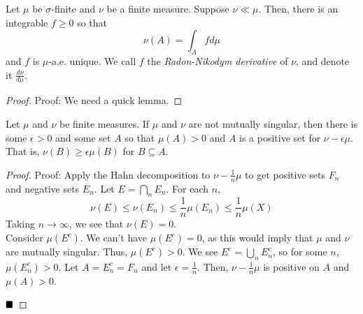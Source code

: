 \begin{theorem}
    Let $\mu$ be $\sigma$-finite and $\nu$ be a finite measure. Suppose $\nu \ll \mu$. Then, there is an integrable $f \geq 0$ so that
    \[ \nu(A) = \int_{A} f d\mu \]
    and $f$ is $\mu$-a.e. unique. We call $f$ the \emph{Radon-Nikodym derivative} of $\nu$, and denote it $\frac{d\nu}{d\mu}$.
\end{theorem}
\begin{proof}{Proof:}
    We need a quick lemma.
\end{proof}

\begin{lemma}
    Let $\mu$ and $\nu$ be finite measures. If $\mu$ and $\nu$ are not mutually singular, then there is some $\epsilon > 0$ and some set $A$ so that $\mu(A) > 0$ and $A$ is a positive set for $\nu - \epsilon\mu$. That is, $\nu(B) \geq \epsilon\mu(B)$ for $B \subseteq A$.
\end{lemma}
\begin{proof}{Proof:}
    Apply the Hahn decomposition to $\nu - \frac{1}{n}\mu$ to get positive sets $F_n$ and negative sets $E_n$. Let $E = \bigcap_{n} E_n$. For each $n$,
    \[ \nu(E) \leq \nu(E_n) \leq \frac{1}{n}\mu(E_n) \leq \frac{1}{n}\mu(X) \]
    Taking $n \to \infty$, we see that $\nu(E) = 0$.\\

    Consider $\mu(E^{c})$. We can't have $\mu(E^{c}) = 0$, as this would imply that $\mu$ and $\nu$ are mutually singular. Thus, $\mu(E^{c}) > 0$. We see $E^{c} = \bigcup_{n} E_n^{c}$, so for some $n$, $\mu(E_n^{c}) > 0$. Let $A = E_n^{c} = F_n$ and let $\epsilon = \frac{1}{n}$. Then, $\nu - \frac{1}{n}\mu$ is positive on $A$ and $\mu(A) > 0$.

    $\qed$
\end{proof}
\vspace{0.5cm}

